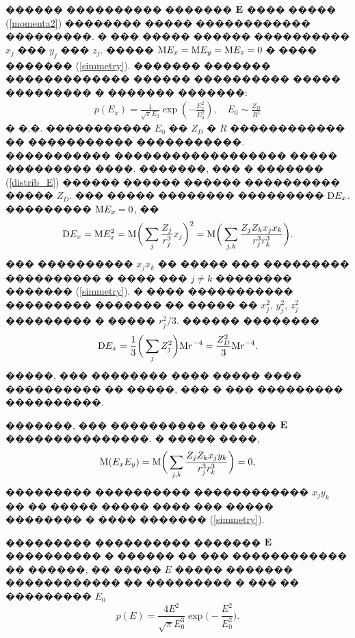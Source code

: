 \documentclass[12pt,titlepage]{article}
\newcommand\M{{\rm M}} %
\newcommand\D{{\rm D}}
\begin{document}
������ ���������� ������� ${\bf E}$ ���� ����� (\ref{momenta2}) �������� ����� ������������ ���������. � ��� ����� ������ ���������� $x_j$ ��� $y_j$ ��� $z_j$. ����� $\M E_x = \M E_y = \M E_z = 0$ � ���� ������� (\ref{simmetry}). ������� ������� ������������� ������ ���������� ����� ��������� � ������� �������:
\begin{gather}
    \label{distrib_E}
    p(E_x) = \frac{1}{\sqrt{\pi}E_0}\exp\left(-\frac{E_x^2}{E_0^2}\right), \quad E_0 \sim \frac{Z_D}{R^2}
\end{gather}
� �.�. ����������� $E_0$ �� $Z_D$ � $R$ ������������ �� ����������� �����������. ����������� ������������������ ����� ��������� ����. �������, ��� � ������� (\ref{distrib_E}) ������ ������ ������ ���������� ����� $Z_D$. ��� ����� �������� ��������� ${\rm D} E_x$. ��������� ${\rm M} E_x = 0$, ��
\begin{gather}
    \label{disp_ex}
    \D E_x = \M E_x^2 = \M \bigg( \sum_j \frac{Z_j}{r_j^3} x_j \bigg)^2 = \M \bigg( \sum_{j,k} \frac{Z_j Z_k x_j x_k}{r_j^3 r_k^3} \bigg).
\end{gather}
��� ���������� $x_j x_k$ �� ����� ��� ��������� ���������� � ���� ��� $j \not= k$ �������� ������� (\ref{simmetry}). � ���� ����������� ��������� ������� �� ����� �� $x_j^2$, $y_j^2$, $z_j^2$ ��������� � ����� $r_j^2/3$. ������ ��������
\begin{gather}
    \D E_x = \frac{1}{3} \bigg( \sum_j Z_j^2 \bigg) \M r^{-4} = \frac{Z_D^2}{3} \M r^{-4}.
\end{gather}
�����, ��� �������� ���� ����� ���� ���������� �� �����, ��� � ��� ��������� ����������.

�������, ��� ���������� ������� ${\bf E}$ ���������������. � ����� ����,
\begin{gather}
    \M (E_x E_y) = \M \bigg( \sum_{j,k} \frac{Z_j Z_k x_j y_k}{r_j^3 r_k^3} \bigg) = 0,
\end{gather}
��������� ���������� ������������ $x_j y_k$ �� �� ����� ����� ���� ��� ����� �������� � ���� ������� (\ref{simmetry}).

��������� ���������� ������� ${\bf E }$ ���������� � ������ �� ��� ������������ �� ������, �� ����� $E$ ����� ������� ������������ �� ��������� � ��� �� ��������� $E_0$
\begin{equation}
    \label{distrib_U}
    p(E) =\frac{4E^{2} }{\sqrt{\pi } E_{0}^{3} } \exp \bigg(-\frac{E^{2} }{E_{0}^{2} } \bigg).
\end{equation}
\end{document}
